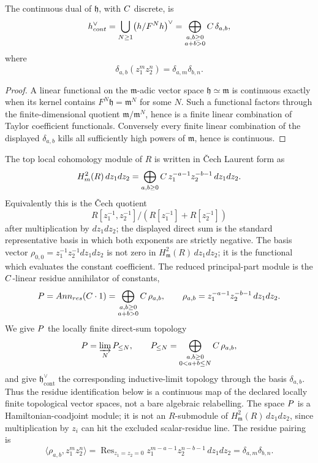 \begin{lem}
\label{lem:app-matlis-continuous-dual}
  The continuous dual of \(\mathfrak h\), with \(C\) discrete, is
  \[
    h^\vee_{cont}
      =\bigcup_{N\geq1}\bigl(h/F^Nh\bigr)^\vee
      =\bigoplus_{\substack{a,b\geq0\\a+b>0}}C\,\delta_{a,b},
  \]
  where
  \[
    \delta_{a,b}(z_1^m z_2^n)=\delta_{a,m}\delta_{b,n}.
  \]
\end{lem}

\begin{proof}
  A linear functional on the \(\mathfrak m\)-adic vector space
  \(\mathfrak h\simeq\mathfrak m\) is continuous exactly when its
  kernel contains \(F^N\mathfrak h=\mathfrak m^N\) for some \(N\).
  Such a functional factors through the finite-dimensional quotient
  \(\mathfrak m/\mathfrak m^N\), hence is a finite linear combination
  of Taylor coefficient functionals.  Conversely every finite linear
  combination of the displayed \(\delta_{a,b}\) kills all sufficiently
  high powers of \(\mathfrak m\), hence is continuous.
\end{proof}

\begin{defn}
\label{def:app-matlis-principal-parts}
  The top local cohomology module of \(R\) is written in \v{C}ech
  Laurent form as
  \[
    H^2_{m}(R)\,dz_1dz_2
      =\bigoplus_{a,b\geq0}
        C\,z_1^{-a-1}z_2^{-b-1}\,dz_1dz_2 .
  \]
  Equivalently this is the \v{C}ech quotient
  \[
    R[z_1^{-1},z_2^{-1}]/(R[z_1^{-1}]+R[z_2^{-1}])
  \]
  after multiplication by \(dz_1dz_2\); the displayed direct sum is
  the standard representative basis in which both exponents are
  strictly negative.
  The basis vector \(\rho_{0,0}=z_1^{-1}z_2^{-1}dz_1dz_2\) is not zero in
  \(H^2_{\mathfrak m}(R)\,dz_1dz_2\); it is the functional which evaluates
  the constant coefficient.  The reduced principal-part module is the
  \(C\)-linear residue annihilator of constants,
  \[
    P=Ann_{res}(C\cdot1)
      =\bigoplus_{\substack{a,b\geq0\\a+b>0}}C\,\rho_{a,b},
      \qquad
    \rho_{a,b}=z_1^{-a-1}z_2^{-b-1}\,dz_1dz_2 .
  \]
  We give \(P\) the locally finite direct-sum topology
  \[
    P=\varinjlim_N P_{\leq N},\qquad
    P_{\leq N}
      =\bigoplus_{\substack{a,b\geq0\\0<a+b\leq N}}C\,\rho_{a,b},
  \]
  and give \(\mathfrak h^\vee_{\mathrm{cont}}\) the corresponding
  inductive-limit topology through the basis \(\delta_{a,b}\). Thus the
  residue identification below is a continuous map of the declared
  locally finite topological vector spaces, not a bare algebraic
  relabelling.  The space \(P\) is a Hamiltonian-coadjoint module; it is
  not an \(R\)-submodule of \(H^2_{\mathfrak m}(R)\,dz_1dz_2\), since
  multiplication by \(z_i\) can hit the excluded scalar-residue line.
  The residue pairing is
  \[
    \langle \rho_{a,b},z_1^m z_2^n\rangle
      =\operatorname{Res}_{z_1=z_2=0}
        z_1^{m-a-1}z_2^{n-b-1}\,dz_1dz_2
      =\delta_{a,m}\delta_{b,n}.
  \]
\end{defn}

